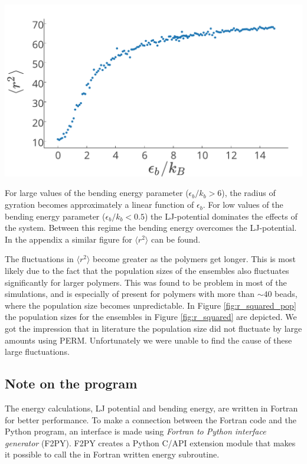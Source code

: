 \begin{Figure}
  \centerfloat
     \includegraphics[scale=0.4]{radius_of_gyr_bending.pdf}
 \label{fig:radius_of_gyr_bending}
\end{Figure}

For large values of the bending energy parameter ($\epsilon_b/k_b>6$), the radius of gyration becomes approximately a linear function of $\epsilon_b$. For low values
of the bending energy parameter ($\epsilon_b/k_b<0.5$) the LJ-potential dominates the effects of the system. Between this regime the bending energy overcomes the LJ-potential. In the appendix a similar figure for $\langle r^2\rangle$ can be found.

The fluctuations in $\langle r^2\rangle$ become greater as the polymers get longer. This is most likely due to the fact that the population sizes of the ensembles also fluctuates significantly for larger polymers. This was found to be problem in most of the simulations, and is especially of present for polymers with more than $\sim 40$ beads, where the population size becomes unpredictable. In Figure \ref{fig:r_squared_pop} the population sizes for the ensembles in Figure \ref{fig:r_squared} are depicted. We got the impression that in literature the population size did not fluctuate by large amounts using PERM. Unfortunately we were unable to find the cause of these large fluctuations.

\subsection{Note on the program}
The energy calculations, LJ potential and bending energy, are written in Fortran for better performance. To make a connection between the Fortran code and the Python program, an interface is made using \emph{Fortran to Python interface generator} (F2PY). F2PY creates a Python C/API extension module that makes it possible to call the in Fortran written energy subroutine.